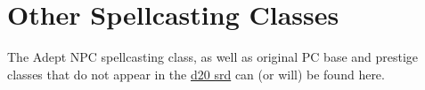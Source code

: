 \section{Other Spellcasting Classes}
The Adept NPC spellcasting class, as well as original PC base and prestige classes that do not appear in the \href{http://www.wizards.com/default.asp?x=d20/article/srd35}{d20 srd} can (or will) be found here.
%
